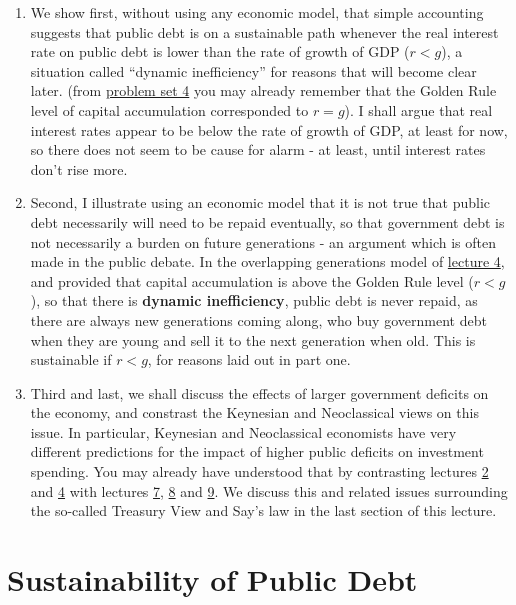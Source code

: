 \documentclass[]{book}
\theoremstyle{definition}
\theoremstyle{definition}
\theoremstyle{definition}
\theoremstyle{remark}
\begin{document}
\begin{enumerate}
\def\labelenumi{\arabic{enumi}.}
\item
  We show first, without using any economic model, that simple
  accounting suggests that public debt is on a sustainable path whenever
  the real interest rate on public debt is lower than the rate of growth
  of GDP (\(r<g\)), a situation called ``dynamic inefficiency'' for
  reasons that will become clear later. (from \href{pset4.html}{problem
  set 4} you may already remember that the Golden Rule level of capital
  accumulation corresponded to \(r=g\)). I shall argue that real
  interest rates appear to be below the rate of growth of GDP, at least
  for now, so there does not seem to be cause for alarm - at least,
  until interest rates don't rise more.
\item
  Second, I illustrate using an economic model that it is not true that
  public debt necessarily will need to be repaid eventually, so that
  government debt is not necessarily a burden on future generations - an
  argument which is often made in the public debate. In the overlapping
  generations model of \href{lecture4.html}{lecture 4}, and provided
  that capital accumulation is above the Golden Rule level (\(r<g\)), so
  that there is \textbf{dynamic inefficiency}, public debt is never
  repaid, as there are always new generations coming along, who buy
  government debt when they are young and sell it to the next generation
  when old. This is sustainable if \(r<g\), for reasons laid out in part
  one.
\item
  Third and last, we shall discuss the effects of larger government
  deficits on the economy, and constrast the Keynesian and Neoclassical
  views on this issue. In particular, Keynesian and Neoclassical
  economists have very different predictions for the impact of higher
  public deficits on investment spending. You may already have
  understood that by contrasting lectures \href{lecture2.html}{2} and
  \href{lecture4.html}{4} with lectures \href{lecture7.html}{7},
  \href{lecture8.html}{8} and \href{lecture9.html}{9}. We discuss this
  and related issues surrounding the so-called Treasury View and Say's
  law in the last section of this lecture.
\end{enumerate}

\section{Sustainability of Public
Debt}\label{sustainability-of-public-debt}
\end{document}
